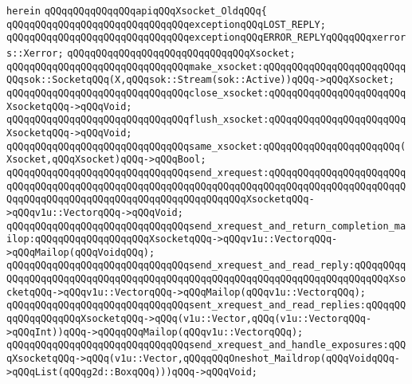 \verb|herein|\newline
\newline
\verb|qQQqqQQqqQQqqQQqapiqQQqXsocket_OldqQQq{|\newline
\newline
\verb|qQQqqQQqqQQqqQQqqQQqqQQqqQQqqQQqexceptionqQQqLOST_REPLY;|\newline
\verb|qQQqqQQqqQQqqQQqqQQqqQQqqQQqqQQqexceptionqQQqERROR_REPLYqQQqqQQqxerrors::Xerror;|\newline
\newline
\verb|qQQqqQQqqQQqqQQqqQQqqQQqqQQqqQQqXsocket;|\newline
\newline
\verb|qQQqqQQqqQQqqQQqqQQqqQQqqQQqqQQqmake_xsocket:qQQqqQQqqQQqqQQqqQQqqQQqqQQqsok::SocketqQQq(X,qQQqsok::Stream(sok::Active))qQQq->qQQqXsocket;|\newline
\newline
\verb|qQQqqQQqqQQqqQQqqQQqqQQqqQQqqQQqclose_xsocket:qQQqqQQqqQQqqQQqqQQqqQQqXsocketqQQq->qQQqVoid;|\newline
\verb|qQQqqQQqqQQqqQQqqQQqqQQqqQQqqQQqflush_xsocket:qQQqqQQqqQQqqQQqqQQqqQQqXsocketqQQq->qQQqVoid;|\newline
\newline
\verb|qQQqqQQqqQQqqQQqqQQqqQQqqQQqqQQqsame_xsocket:qQQqqQQqqQQqqQQqqQQqqQQq(Xsocket,qQQqXsocket)qQQq->qQQqBool;|\newline
\newline
\verb|qQQqqQQqqQQqqQQqqQQqqQQqqQQqqQQqsend_xrequest:qQQqqQQqqQQqqQQqqQQqqQQqqQQqqQQqqQQqqQQqqQQqqQQqqQQqqQQqqQQqqQQqqQQqqQQqqQQqqQQqqQQqqQQqqQQqqQQqqQQqqQQqqQQqqQQqqQQqqQQqqQQqqQQqqQQqqQQqXsocketqQQq->qQQqv1u::VectorqQQq->qQQqVoid;|\newline
\verb|qQQqqQQqqQQqqQQqqQQqqQQqqQQqqQQqsend_xrequest_and_return_completion_mailop:qQQqqQQqqQQqqQQqqQQqXsocketqQQq->qQQqv1u::VectorqQQq->qQQqMailop(qQQqVoidqQQq);|\newline
\verb|qQQqqQQqqQQqqQQqqQQqqQQqqQQqqQQqsend_xrequest_and_read_reply:qQQqqQQqqQQqqQQqqQQqqQQqqQQqqQQqqQQqqQQqqQQqqQQqqQQqqQQqqQQqqQQqqQQqqQQqqQQqXsocketqQQq->qQQqv1u::VectorqQQq->qQQqMailop(qQQqv1u::VectorqQQq);|\newline
\newline
\verb|qQQqqQQqqQQqqQQqqQQqqQQqqQQqqQQqsent_xrequest_and_read_replies:qQQqqQQqqQQqqQQqqQQqXsocketqQQq->qQQq(v1u::Vector,qQQq(v1u::VectorqQQq->qQQqInt))qQQq->qQQqqQQqMailop(qQQqv1u::VectorqQQq);|\newline
\newline
\verb|qQQqqQQqqQQqqQQqqQQqqQQqqQQqqQQqsend_xrequest_and_handle_exposures:qQQqXsocketqQQq->qQQq(v1u::Vector,qQQqqQQqOneshot_Maildrop(qQQqVoidqQQq->qQQqList(qQQqg2d::BoxqQQq)))qQQq->qQQqVoid;|\newline
